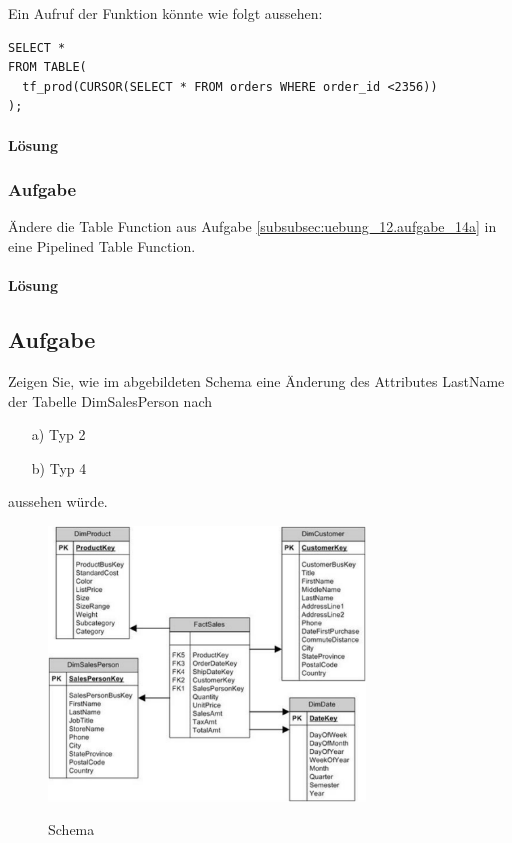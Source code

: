 Ein Aufruf der Funktion könnte wie folgt aussehen:
\begin{verbatim}
SELECT * 
FROM TABLE(
  tf_prod(CURSOR(SELECT * FROM orders WHERE order_id <2356))
);
\end{verbatim}

\paragraph*{Lösung}
\label{subsubsec:uebung_12.aufgabe_14a.loesung}

\subsubsection{Aufgabe}
\label{subsec:uebung_12.aufgabe_14b}
Ändere die Table Function aus Aufgabe \ref{subsubsec:uebung_12.aufgabe_14a} in eine Pipelined Table Function.

\paragraph*{Lösung}
\label{subsubsec:uebung_12.aufgabe_14b.loesung}


\subsection{Aufgabe}
\label{subsec:uebung_12.aufgabe_15}
Zeigen Sie, wie im abgebildeten Schema eine Änderung des Attributes \glqq{}LastName\grqq{} der Tabelle \glqq{}DimSalesPerson\grqq{} nach 

\begin{itemize}[itemsep=0pt]
  \item[a)] Typ 2
  \item[b)] Typ 4
\end{itemize}

aussehen würde.


\begin{figure}[H]
  \centering
  \includegraphics[width=0.75\textwidth]{img//uebung_12_-_aufgabe_15.png}
  \label{img:uebung_12_-_aufgabe_15}
  \caption{Schema}
\end{figure}
